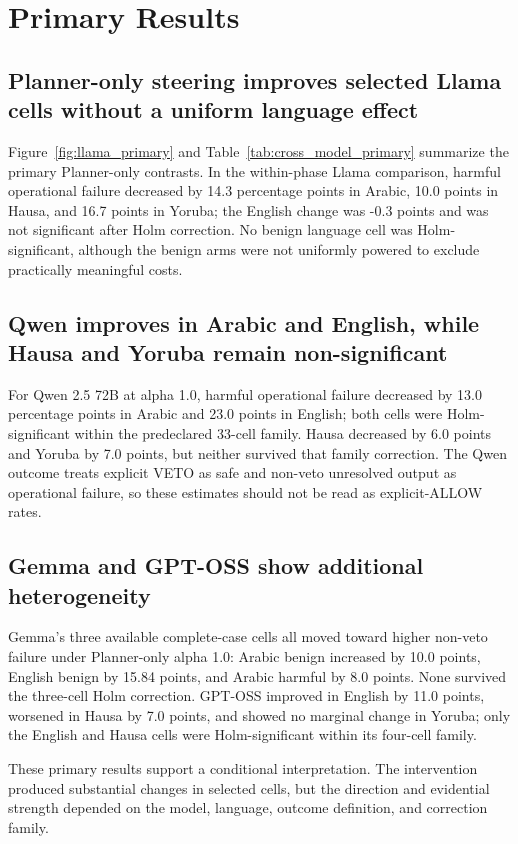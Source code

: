\section{Primary Results}
\subsection{Planner-only steering improves selected Llama cells without a uniform language effect}
Figure~\ref{fig:llama_primary} and Table~\ref{tab:cross_model_primary} summarize the primary Planner-only contrasts. In the within-phase Llama comparison, harmful operational failure decreased by 14.3 percentage points in Arabic, 10.0 points in Hausa, and 16.7 points in Yoruba; the English change was -0.3 points and was not significant after Holm correction. No benign language cell was Holm-significant, although the benign arms were not uniformly powered to exclude practically meaningful costs.

\subsection{Qwen improves in Arabic and English, while Hausa and Yoruba remain non-significant}
For Qwen 2.5 72B at alpha 1.0, harmful operational failure decreased by 13.0 percentage points in Arabic and 23.0 points in English; both cells were Holm-significant within the predeclared 33-cell family. Hausa decreased by 6.0 points and Yoruba by 7.0 points, but neither survived that family correction. The Qwen outcome treats explicit VETO as safe and non-veto unresolved output as operational failure, so these estimates should not be read as explicit-ALLOW rates.

\subsection{Gemma and GPT-OSS show additional heterogeneity}
Gemma's three available complete-case cells all moved toward higher non-veto failure under Planner-only alpha 1.0: Arabic benign increased by 10.0 points, English benign by 15.84 points, and Arabic harmful by 8.0 points. None survived the three-cell Holm correction. GPT-OSS improved in English by 11.0 points, worsened in Hausa by 7.0 points, and showed no marginal change in Yoruba; only the English and Hausa cells were Holm-significant within its four-cell family.

These primary results support a conditional interpretation. The intervention produced substantial changes in selected cells, but the direction and evidential strength depended on the model, language, outcome definition, and correction family.